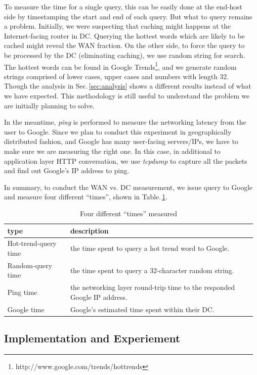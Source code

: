 To measure the time for a single query, this can be easily done at the end-host side by timestamping the start and end of each query. But what to query remains a problem. Initially, we were suspecting that caching might happens at the Internet-facing router in DC. Querying the hottest words which are likely to be cached might reveal the WAN fraction. On the other side, to force the query to be processed by the DC (eliminating caching), we use random string for search. The hottest words can be found in Google Trends\footnote{http://www.google.com/trends/hottrends}, and we generate random strings comprised of lower cases, upper cases and numbers with length 32. Though the analysis in Sec.\,\ref{sec:analysis} shows a different results instead of what we have expected. This methodology is still useful to understand the problem we are initially planning to solve. 

In the meantime, {\it ping} is performed to measure the networking latency from the user to Google. Since we plan to conduct this experiment in geographically distributed fashion, and Google has many user-facing servers/IPs, we have to make sure we are measuring the right one. In this case, in additional to application layer HTTP conversation, we use {\it tcpdump} to capture all the packets and find out Google's IP address to ping.
 
In summary, to conduct the WAN vs. DC measurement, we issue query to Google and measure four different ``times'', shown in Table.\,\ref{tab:DC_method}.

\begin{table}
  \begin{tabular}{p{2.8cm} | p{5cm}}
    \hline
    type & description \\
    \hline
    Hot-trend-query time & the time spent to query a hot trend word to Google. \\
    Random-query time & the time spent to query a 32-character random string.  \\
    Ping time & the networking layer round-trip time to the responded Google IP address. \\
    Google time & Google's estimated time spent within their DC. \\
    \hline
  \end{tabular}
  \caption{Four different ``times'' measured}
  \label{tab:DC_method}
\end{table}

\subsection{Implementation and Experiement}
\label{sec:impl-exper}

